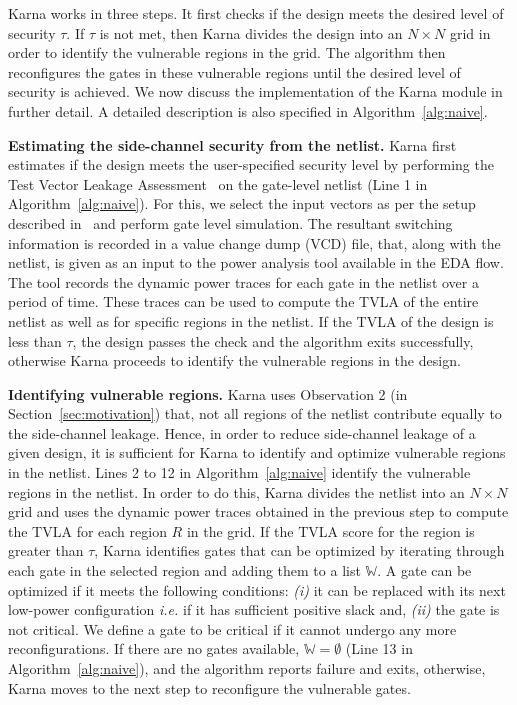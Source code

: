 {\sf Karna} works in three steps. It first checks if the design meets the desired level of security $\tau$. If $\tau$ is not met, then {\sf Karna} divides the design into an $N \times N$ grid in order to identify the vulnerable regions in the grid. The algorithm then reconfigures the gates in these vulnerable regions until the desired level of security is achieved. We now discuss the implementation of the {\sf Karna} module in further detail. A detailed description is also specified in  Algorithm~\ref{alg:naive}.

{\flushleft \bf Estimating the side-channel security from the netlist.}
{\sf Karna} first estimates if the design meets the user-specified security level by performing the Test Vector Leakage Assessment~\cite{becker:2013} on the gate-level netlist (Line 1 in Algorithm~\ref{alg:naive}). For this, we select the input vectors as per the setup described in~\cite{becker:2013} and perform gate level simulation. The resultant switching information is recorded in a value change dump (VCD) file, that, along with the netlist, is given as an input to the power analysis tool available in the EDA flow. The tool  records the dynamic power traces for each gate in the netlist over a period of time. These traces can be used to compute the TVLA of the entire netlist as well as for specific regions in the netlist. If the TVLA of the design is less than $\tau$, the design passes the check and the algorithm exits successfully, otherwise {\sf Karna} proceeds to identify the vulnerable regions in the design.

{\flushleft \bf Identifying vulnerable regions.}
 {\sf Karna} uses Observation 2 (in Section~\ref{sec:motivation}) that, not all regions of the netlist contribute equally to the side-channel leakage. Hence, in order to reduce  side-channel leakage of a given design, it is sufficient for {\sf Karna}  to identify and optimize vulnerable regions in the netlist. Lines 2 to 12 in Algorithm~\ref{alg:naive} identify the vulnerable regions in the netlist. In order to do this, {\sf Karna} divides the netlist into an $N\times N$ grid and uses the dynamic power traces obtained in the previous step to compute the TVLA for each region $R$ in the grid. If the TVLA score for the region is greater than $\tau$, {\sf Karna} identifies gates that can be optimized by iterating through each gate in the selected region and adding them to a list $\mathbb W$. 
 A gate can be optimized if it meets the following conditions: {\em (i)} it can be replaced with its next low-power configuration {\em i.e.} if it has sufficient positive slack and, {\em (ii)} the gate is not critical. We define a gate to be critical if it cannot undergo any more reconfigurations. If there are no gates available, $\mathbb W = \emptyset$ (Line 13 in Algorithm~\ref{alg:naive}), and the algorithm reports failure and exits, otherwise, {\sf Karna} moves to the next step to reconfigure the vulnerable gates.
 
